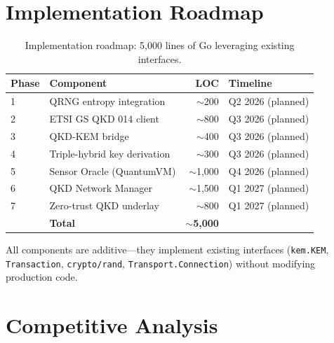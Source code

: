 \documentclass[11pt,letterpaper]{article}
\begin{document}
\section{Implementation Roadmap}

\begin{table}[H]
\centering
\begin{tabular}{@{}llrl@{}}
\toprule
\textbf{Phase} & \textbf{Component} & \textbf{LOC} & \textbf{Timeline} \\
\midrule
1 & QRNG entropy integration & $\sim$200 & Q2 2026 (planned) \\
2 & ETSI GS QKD 014 client & $\sim$800 & Q3 2026 (planned) \\
3 & QKD-KEM bridge & $\sim$400 & Q3 2026 (planned) \\
4 & Triple-hybrid key derivation & $\sim$300 & Q3 2026 (planned) \\
5 & Sensor Oracle (QuantumVM) & $\sim$1,000 & Q4 2026 (planned) \\
6 & QKD Network Manager & $\sim$1,500 & Q1 2027 (planned) \\
7 & Zero-trust QKD underlay & $\sim$800 & Q1 2027 (planned) \\
\midrule
& \textbf{Total} & \textbf{$\sim$5,000} & \\
\bottomrule
\end{tabular}
\caption{Implementation roadmap: 5,000 lines of Go leveraging existing interfaces.}
\label{tab:roadmap}
\end{table}

All components are additive---they implement existing interfaces (\texttt{kem.KEM}, \texttt{Transaction}, \texttt{crypto/rand}, \texttt{Transport.Connection}) without modifying production code.

\section{Competitive Analysis}
\end{document}

